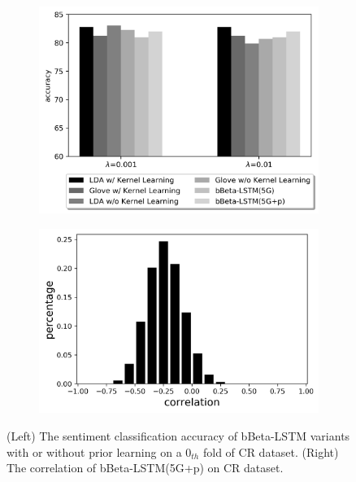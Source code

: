 \documentclass[letterpaper]{article} %
\begin{document}
\begin{figure}
	\centering
	\begin{subfigure}[]{0.48\columnwidth}
		\includegraphics[width=\linewidth]{accuracy_cr0_LDA_glove.png}
	\end{subfigure}
	\begin{subfigure}[]{0.48\columnwidth}
		\includegraphics[width=\linewidth]{cr_tr_GBetalstm_corr.png}
	\end{subfigure}
	\caption{(Left) The sentiment classification accuracy of bBeta-LSTM variants with or without prior learning on a $0_{th}$ fold of CR dataset. (Right) The correlation of bBeta-LSTM(5G+p) on CR dataset.}
	\label{fig:prior_learning_corr_cr_mr}
\end{figure}
\end{document}

